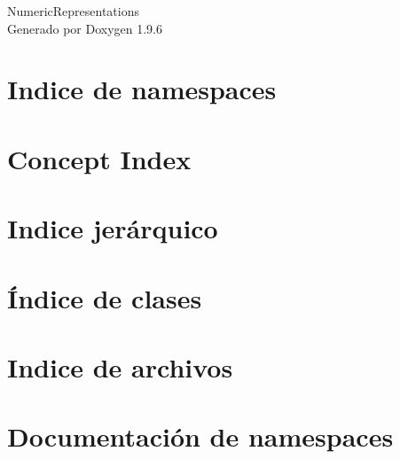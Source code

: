 \documentclass[twoside]{book}
\newcommand{\+}{\discretionary{\mbox{\scriptsize$\hookleftarrow$}}{}{}}
\newcommand{\clearemptydoublepage}{%
    \newpage{\pagestyle{empty}\cleardoublepage}%
  }
\begin{document}
  \raggedbottom
    \hypersetup{pageanchor=false,
                bookmarksnumbered=true,
                pdfencoding=unicode
               }
  \begin{titlepage}
  \vspace*{7cm}
  \begin{center}%
  {\Large Numeric\+Representations}\\
  \vspace*{1cm}
  {\large Generado por Doxygen 1.9.6}\\
  \end{center}
  \end{titlepage}
  \clearemptydoublepage
  \tableofcontents
  \clearemptydoublepage
  \hypersetup{pageanchor=true}
\chapter{Indice de namespaces}

\chapter{Concept Index}

\chapter{Indice jerárquico}

\chapter{Índice de clases}

\chapter{Indice de archivos}

\chapter{Documentación de namespaces}















\end{document}
